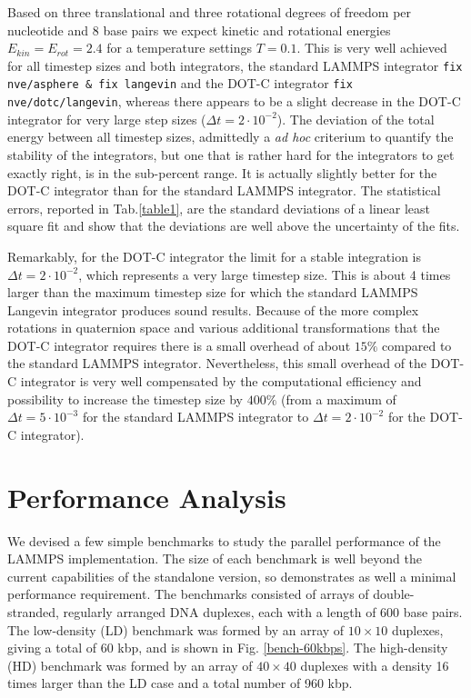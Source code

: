 \documentclass[12pt,onecolumn]{article}
\begin{document}
Based on three translational and three rotational degrees of freedom per nucleotide and 8 base pairs we expect kinetic and rotational energies $E_{kin}=E_{rot}=2.4$ 
for a temperature settings $T=0.1$. This is very well achieved for all timestep sizes and both integrators, the standard LAMMPS integrator \texttt{fix nve/asphere \& fix langevin} and the DOT-C integrator \texttt{fix nve/dotc/langevin}, whereas there appears to be a slight decrease in the 
DOT-C integrator for very large step sizes ($\Delta t=2\cdot10^{-2}$).
The deviation of the total energy between all timestep sizes, admittedly a {\it ad hoc} criterium to quantify the stability of the integrators,
but one that is rather hard for the integrators to get exactly right, is in the sub-percent range.
It is actually slightly better for the DOT-C integrator than for the standard LAMMPS integrator. 
The statistical errors, reported in Tab.\ref{table1}, are the standard deviations of a linear least square fit and 
show that the deviations are well above the uncertainty of the fits.

Remarkably, for the DOT-C integrator the limit for a stable integration is $\Delta t=2\cdot10^{-2}$, which represents a very large timestep size. 
This is about 4 times larger than the maximum timestep size for which the standard LAMMPS Langevin integrator produces sound results.
Because of the more complex rotations in quaternion space and various additional transformations that the DOT-C integrator requires
there is a small overhead of about $15\%$ compared to the standard LAMMPS integrator. Nevertheless, this small overhead of the DOT-C
integrator is very well compensated by the computational efficiency and possibility to increase the timestep 
size by $400\%$ (from a maximum of $\Delta t=5\cdot10^{-3}$ for the standard LAMMPS integrator to $\Delta t=2\cdot10^{-2}$ for the DOT-C integrator).


\section{Performance Analysis}

We devised a few simple benchmarks to study the parallel performance of the LAMMPS implementation. The size of each benchmark is well beyond the 
current capabilities of the standalone version, so demonstrates as well a minimal performance requirement. 
The benchmarks consisted of arrays of double-stranded, regularly arranged DNA duplexes, each with a length of 600 base pairs.
The low-density (LD) benchmark was formed by an array of $10 \times 10$ duplexes, giving a total of 60 kbp, and is shown in Fig. \ref{bench-60kbps}. 
The high-density (HD) benchmark was formed by an array of $40\times 40$ duplexes with a density 16 times larger than the LD case and a total number
of 960 kbp.
\end{document}
